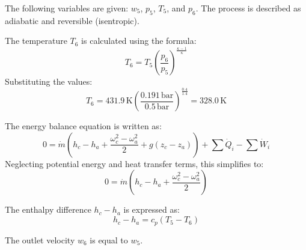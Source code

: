 The following variables are given: \( w_5 \), \( p_5 \), \( T_5 \), and \( p_6 \). The process is described as adiabatic and reversible (isentropic).  

The temperature \( T_6 \) is calculated using the formula:  
\[
T_6 = T_5 \left( \frac{p_6}{p_5} \right)^{\frac{\kappa - 1}{\kappa}}
\]  
Substituting the values:  
\[
T_6 = 431.9 \, \text{K} \left( \frac{0.191 \, \text{bar}}{0.5 \, \text{bar}} \right)^{\frac{0.4}{1.4}} = 328.0 \, \text{K}
\]  

The energy balance equation is written as:  
\[
0 = \dot{m} \left( h_c - h_a + \frac{\omega_c^2 - \omega_a^2}{2} + g(z_c - z_a) \right) + \sum \dot{Q}_i - \sum \dot{W}_i
\]  
Neglecting potential energy and heat transfer terms, this simplifies to:  
\[
0 = \dot{m} \left( h_c - h_a + \frac{\omega_c^2 - \omega_a^2}{2} \right)
\]  

The enthalpy difference \( h_c - h_a \) is expressed as:  
\[
h_c - h_a = c_p (T_5 - T_6)
\]  

The outlet velocity \( w_6 \) is equal to \( w_5 \).